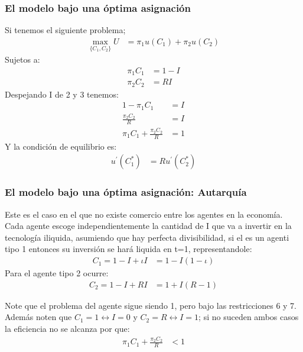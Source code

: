 \begin{frame}
    \frametitle{{\normalsize El modelo bajo una óptima asignación } {}}
    
    Si tenemos el siguiente problema;
   \begin{align}
   \max_{\{C_{1},C_{2}\}}U&=\pi_{1}u(C_{1})+\pi_{2}u(C_{2})
   \end{align}
   Sujetos a:
   \begin{align}
   \pi_{1}C_{1}&=1-I\\
   \pi_{2}C_{2}&=RI
   \end{align}
   Despejando I de 2 y 3 tenemos:
   \begin{align}
   1-\pi_{1}C_{1}&=I\nonumber\\
   \frac{\pi_{2}C_{2}}{R}&=I\nonumber\\
   \pi_{1}C_{1}+\frac{\pi_{2}C_{2}}{R}&=1
   \end{align}
   Y la condición de equilibrio es:
   \begin{align}
   u^{'}(C_{1}^{*})&=Ru^{'}(C_{2}^{*})
   \end{align}
\end{frame}

\begin{frame}
    \frametitle{{\normalsize El modelo bajo una óptima asignación: Autarquía } {}}
   Este es el caso en el que no existe comercio entre los agentes en la economía. Cada agente escoge independientemente la cantidad de I que va a invertir en la tecnología iliquida, asumiendo que hay perfecta divisibilidad, si el es un agenti tipo 1 entonces su inversión se hará liquida en t=1, representandole:  \\
    \begin{align}
    C_{1}=1-I+\iota I&=1-I(1-\iota)
    \end{align}
   Para el agente tipo 2 ocurre:
   \begin{align}
   C_{2}=1-I+R I&=1+I(R-1)
   \end{align}
   
 Note que el problema del agente sigue siendo 1, pero bajo las restricciones 6 y 7.\\
 Además noten que $C_{1}=1\longleftrightarrow I=0$ y $C_{2}=R\longleftrightarrow I=1$; si no suceden ambos casos la eficiencia no se alcanza por que:
 \begin{align}
 \pi_{1}C_{1}+\frac{\pi_{2}C_{2}}{R}&<1
 \end{align}
 
 
\end{frame}


